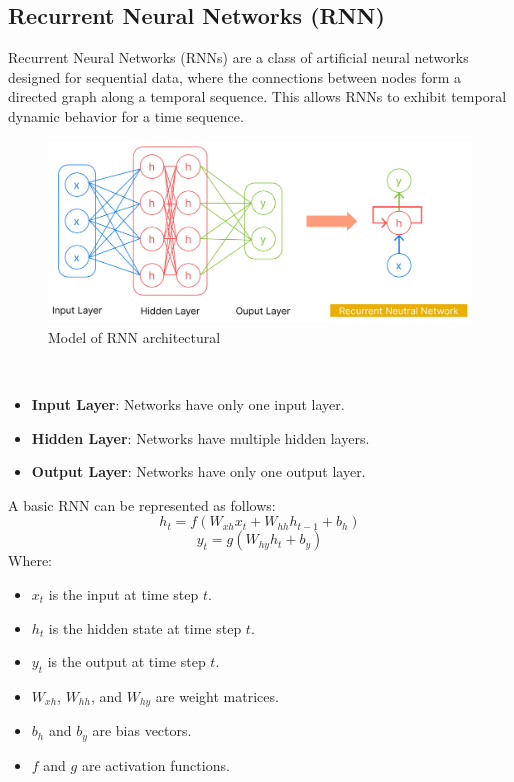 \documentclass{ieeeojies}
\begin{document}
\subsection{Recurrent Neural Networks (RNN)}
Recurrent Neural Networks (RNNs) are a class of artificial neural networks designed for sequential data, where the connections between nodes form a directed graph along a temporal sequence. This allows RNNs to exhibit temporal dynamic behavior for a time sequence.\
\begin{figure}[h]
    \centering
    \includegraphics[width=\linewidth]{./image/RNN.png}
    \caption{Model of RNN architectural}
    \label{fig:7}
\end{figure}\\
\begin {itemize}
\item \textbf{Input Layer}: Networks have only one input layer.
\item \textbf{Hidden Layer}: Networks have multiple hidden layers.
\item \textbf{Output Layer}: Networks have only one output layer.
\end {itemize}
A basic RNN can be represented as follows:
\begin{dmath*}
    h_t = f(W_{xh} x_t + W_{hh} h_{t-1} + b_h)
\end{dmath*}
\begin{dmath*}
    y_t = g(W_{hy} h_t + b_y)
\end{dmath*}
Where:\begin {itemize}
\item \(x_t\) is the input at time step \(t\).
\item \(h_t\) is the hidden state at time step \(t\).
\item \(y_t\) is the output at time step \(t\).
\item \(W_{xh}\), \(W_{hh}\), and \(W_{hy}\) are weight matrices.
\item \(b_h\) and \(b_y\) are bias vectors.
\item \(f\) and \(g\) are activation functions.
\end{itemize}
\end{document}
